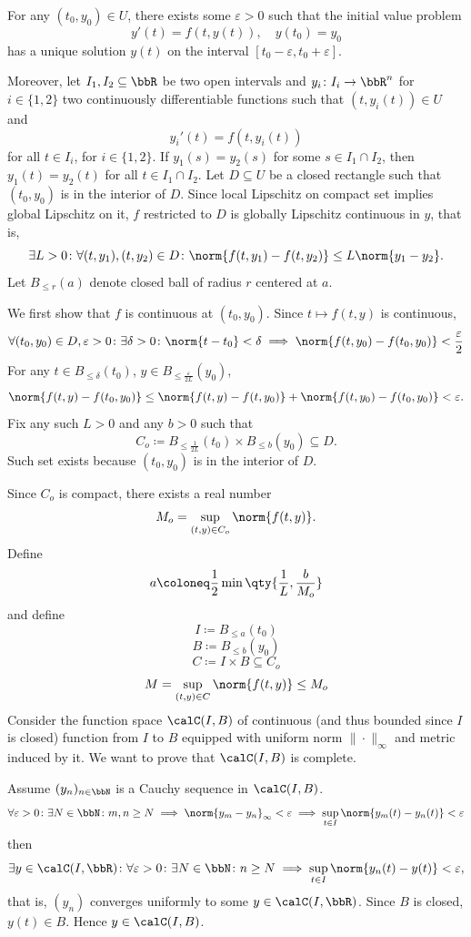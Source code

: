 \documentclass[a4paper,12pt]{report}
\begin{document}
For any $(t_0,y_0)\in U$, there exists some $\varepsilon>0$ such that the initial value problem
\[y'(t)=f(t,y(t)),\quad y(t_0)=y_0\]
has a unique solution $y(t)$ on the interval $[t_0-\varepsilon,t_0+\varepsilon]$.

Moreover, let $I_1,I_2\subseteq\bbR$ be two open intervals and $y_i\colon I_i\to\bbR^n$ for $i\in\{1,2\}$ two continuously differentiable functions such that $(t,y_i(t))\in U$ and
\[y_i'(t)=f(t,y_i(t))\]
for all $t\in I_i$, for $i\in\{1,2\}$. If $y_1(s)=y_2(s)$ for some $s\in I_1\cap I_2$, then $y_1(t)=y_2(t)$ for all $t\in I_1\cap I_2$.
\bpr
Let $D\subseteq U$ be a closed rectangle such that $(t_0,y_0)$ is in the interior of $D$. Since local Lipschitz on compact set implies global Lipschitz on it, $f$ restricted to $D$ is globally Lipschitz continuous in $y$, that is,
\[\exists L>0\colon\forall (t,y_1),(t,y_2)\in D\colon\norm{f(t,y_1)-f(t,y_2)}\le L\norm{y_1-y_2}.\]
Let $B_{\leq r}(a)$ denote closed ball of radius $r$ centered at $a$.

We first show that $f$ is continuous at $(t_0,y_0)$. Since $t\mapsto f(t,y)$ is continuous,
\[\forall (t_0,y_0)\in D,\varepsilon>0\colon\exists\delta>0\colon\norm{t-t_0}<\delta\implies\norm{f(t,y_0)-f(t_0,y_0)}<\frac{\varepsilon}{2}\]
For any $t\in B_{\leq\delta}(t_0)$, $y\in B_{\le\frac{\varepsilon}{2L}}(y_0)$,
\[\norm{f(t,y)-f(t_0,y_0)}\le\norm{f(t,y)-f(t,y_0)}+\norm{f(t,y_0)-f(t_0,y_0)}<\varepsilon.\]
Fix any such $L>0$ and any $b>0$ such that
\[C_o\coloneq B_{\leq\frac{1}{2L}}(t_0)\times B_{\le b}(y_0)\subseteq D.\]
Such set exists because $(t_0,y_0)$ is in the interior of $D$.

Since $C_o$ is compact, there exists a real number
\[M_o=\sup_{(t,y)\in C_o}\norm{f(t,y)}.\]
Define
\[a\coloneq\frac{1}{2}\min\qty{\frac{1}{L},\frac{b}{M_o}}\]
and define
\[I\coloneq B_{\leq a}(t_0)\]
\[B\coloneq B_{\leq b}(y_0)\]
\[C\coloneq I\times B\subseteq C_o\]
\[M=\sup_{(t,y)\in C}\norm{f(t,y)}\le M_o\]
Consider the function space $\calC(I,B)$ of continuous (and thus bounded since $I$ is closed) function from $I$ to $B$ equipped with uniform norm $\|\cdot\|_{\infty}$ and metric induced by it. We want to prove that $\calC(I,B)$ is complete.

Assume $(y_n)_{n\in\bbN}$ is a Cauchy sequence in $\calC(I,B)$.
\[\forall\varepsilon>0\colon\exists N\in\bbN\colon m,n\ge N\implies\norm{y_m-y_n}_{\infty}<\varepsilon\implies\sup_{t\in I}\norm{y_m(t)-y_n(t)}<\varepsilon\]
then
\[\exists y\in\calC(I,\bbR)\colon\forall\varepsilon>0\colon\exists N\in\bbN\colon n\ge N\implies\sup_{t\in I}\norm{y_n(t)-y(t)}<\varepsilon,\]
that is, $(y_n)$ converges uniformly to some $y\in\calC(I,\bbR)$. Since $B$ is closed, $y(t)\in B$. Hence $y\in\calC(I,B)$.
\end{document}
